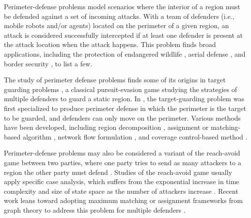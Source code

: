 Perimeter-defense problems model scenarios where the interior of a region must be defended against a set of incoming attacks.
%
With a team of defenders (i.e., mobile robots and/or agents) located on the perimeter of a given region, an attack is considered successfully intercepted if at least one defender is present at the attack location when the attack happens. 
%
This problem finds broad applications, including the protection of endangered wildlife \cite{haksar2020spatial}, aerial defense \cite{lykou2020defending, lee2020perimeter}, and border security \cite{agmon2008multi, fengoptimally}, to list a few. 

The study of perimeter defense problems finds some of its origins in target guarding problems \cite{rufus1965}, a classical pursuit-evasion game studying the strategies of multiple defenders to guard a static region.
%
In \cite{shishika2018local}, the target-guarding problem was first specialized to produce perimeter defense in which the perimeter is the target to be guarded, and defenders can only move on the perimeter. 
%
Various methods have been developed, including region decomposition \cite{shishika2018local}, assignment or matching-based algorithm \cite{shishika2020cooperative}, network flow formulation \cite{chen2021optimal}, and coverage control-based method \cite{macharet2020adaptive}.

Perimeter-defense problems may also be considered a variant of the reach-avoid game between two parties, where one party tries to send as many attackers to a region the other party must defend \cite{rufus1965}. 
%
Studies of the reach-avoid game usually apply specific case analysis, which suffers from the exponential increase in time complexity and size of state space as the number of attackers increase \cite{margellos2011hamilton, zhou2012general, yan2018reach}. 
%
Recent work leans toward adopting maximum matching or assignment frameworks from graph theory to address this problem for multiple defenders \cite{chen2014path, chen2014multiplayer, yan2019matching}.


